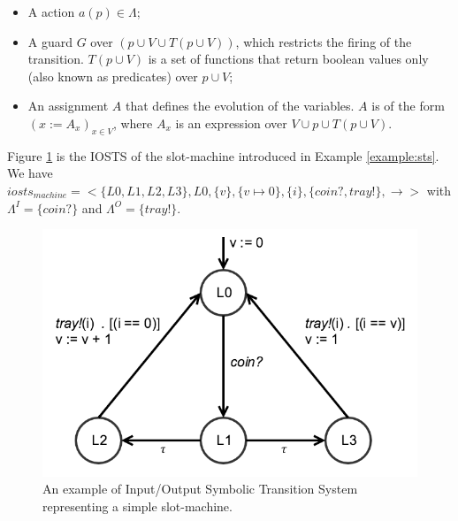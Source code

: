 \begin{definition}
\begin{itemize}
        \begin{itemize}
            \item A action $a(p) \in \Lambda$;

            \item A guard  $G$ over $(p \cup V \cup T(p \cup
                V))$, which restricts the firing of the
                transition. $T(p \cup V)$ is a set of functions
                that return boolean values only (also known as
                predicates) over $p \cup V$;

            \item An assignment $A$ that defines the evolution of
                the variables. $A$ is of the form $(x:=A_x)_{x\in
                V}$, where $A_x$ is an expression over $V \cup p
                \cup T(p \cup V)$.
        \end{itemize}
\end{itemize}
\end{definition}

\begin{example}
    Figure \ref{fig:iosts-example} is the IOSTS of the
    slot-machine introduced in Example \vref{example:sts}.  We
    have $iosts_{machine} = <\{L0, L1, L2, L3\}, L0, \{ v \}, \{
    v \mapsto 0 \}, \{ i \}, \{ coin?, tray! \}, \rightarrow >$
    with $\Lambda^I = \{ coin? \}$ and $\Lambda^O = \{ tray! \}$.

    \begin{figure}[ht]
        \begin{center}
            \includegraphics[width=0.7\linewidth]{figures/iosts-example.png}
        \end{center}

        \caption{An example of Input/Output Symbolic Transition
        System representing a simple slot-machine.}
        \label{fig:iosts-example}
    \end{figure}
\end{example}

